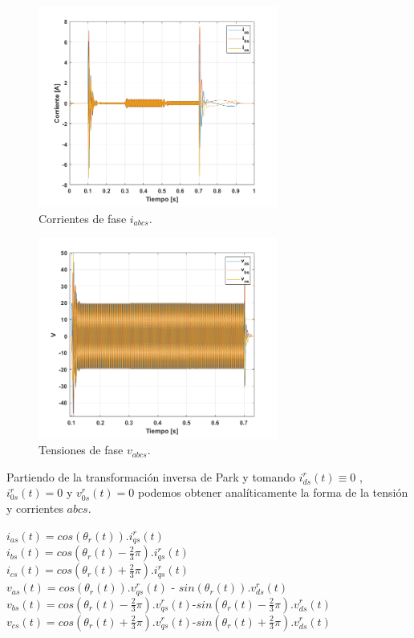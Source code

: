 \documentclass[10pt]{article}
\begin{document}
\begin{itemize}
	\begin{figure}[h!]
	\centering
	\includegraphics[width=0.7\textwidth]{corriente.png}
	\caption{\label{fig:corriente} Corrientes de fase $i_{abcs}$.}
	\end{figure}
	\begin{figure}[h!]
	\centering
	\includegraphics[width=0.7\textwidth]{v.png}
	\caption{\label{fig:v} Tensiones de fase $v_{abcs}$.}
	\end{figure}
	\newpage
	Partiendo de la transformación inversa de Park y tomando $i^{r}_{ds}(t) \equiv 0$ , $i^{r}_{0s}(t)=0$ y $v^{r}_{0s}(t)=0$ podemos obtener analíticamente la forma de la tensión y corrientes $abcs$.
	
	$i_{as}(t)=cos(\theta_{r}(t)).i^{r}_{qs}(t)$\\
	$i_{bs}(t)=cos(\theta_{r}(t)-\frac{2}{3}\pi).i^{r}_{qs}(t)$\\
	$i_{cs}(t)=cos(\theta_{r}(t)+\frac{2}{3}\pi).i^{r}_{qs}(t)$\\
	$v_{as}(t)=cos(\theta_{r}(t)).v^{r}_{qs}(t)$ - $ sin(\theta_{r}(t)). v^{r}_{ds}(t)$\\
	$v_{bs}(t)=cos(\theta_{r}(t)-\frac{2}{3}\pi).v^{r}_{qs}(t)$-$sin(\theta_{r}(t)-\frac{2}{3}\pi). v^{r}_{ds}(t)$\\
	$v_{cs}(t)=cos(\theta_{r}(t)+\frac{2}{3}\pi).v^{r}_{qs}(t)$-$sin(\theta_{r}(t)+\frac{2}{3}\pi). v^{r}_{ds}(t)$\\
	

\end{itemize}
\end{document}
